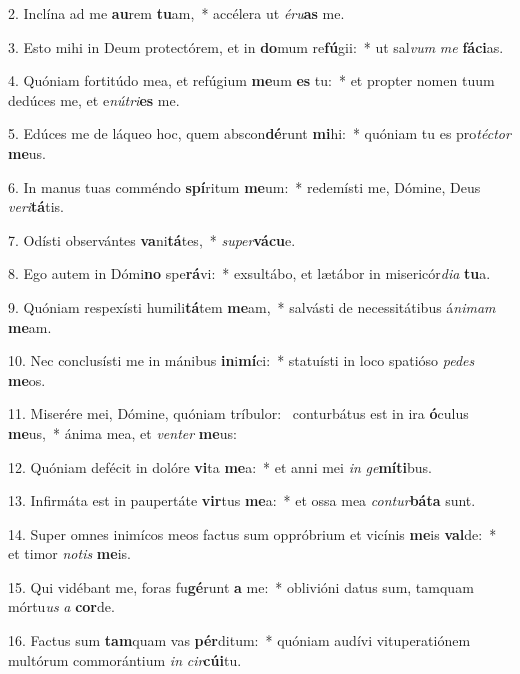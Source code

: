 2. Inclína ad me \textbf{au}rem \textbf{tu}am,~*  accélera ut \textit{é}\textit{ru}\textbf{as} me.\

3. Esto mihi in Deum protectórem, et in \textbf{do}mum re\textbf{fú}gii:~*  ut sal\textit{vum} \textit{me} \textbf{fá}\textbf{ci}as.\

4. Quóniam fortitúdo mea, et refúgium \textbf{me}um \textbf{es} tu:~*  et propter nomen tuum dedúces me, et e\textit{nú}\textit{tri}\textbf{es} me.\

5. Edúces me de láqueo hoc, quem abscon\textbf{dé}runt \textbf{mi}hi:~*  quóniam tu es pro\textit{téc}\textit{tor} \textbf{me}us.\

6. In manus tuas comméndo \textbf{spí}ritum \textbf{me}um:~*  redemísti me, Dómine, Deus \textit{ve}\textit{ri}\textbf{tá}tis.\

7. Odísti observántes \textbf{va}ni\textbf{tá}tes,~*  \textit{su}\textit{per}\textbf{vá}\textbf{cu}e.\

8. Ego autem in Dómi\textbf{no} spe\textbf{rá}vi:~*  exsultábo, et lætábor in misericór\textit{di}\textit{a} \textbf{tu}a.\

9. Quóniam respexísti humili\textbf{tá}tem \textbf{me}am,~*  salvásti de necessitátibus á\textit{ni}\textit{mam} \textbf{me}am.\

10. Nec conclusísti me in mánibus \textbf{in}i\textbf{mí}ci:~*  statuísti in loco spatióso \textit{pe}\textit{des} \textbf{me}os.\

11. Miserére mei, Dómine, quóniam tríbulor: \dag\  conturbátus est in ira \textbf{ó}culus \textbf{me}us,~*  ánima mea, et \textit{ven}\textit{ter} \textbf{me}us:\

12. Quóniam defécit in dolóre \textbf{vi}ta \textbf{me}a:~*  et anni mei \textit{in} \textit{ge}\textbf{mí}\textbf{ti}bus.\

13. Infirmáta est in paupertáte \textbf{vir}tus \textbf{me}a:~*  et ossa mea \textit{con}\textit{tur}\textbf{bá}\textbf{ta} sunt.\

14. Super omnes inimícos meos factus sum oppróbrium et vicínis \textbf{me}is \textbf{val}de:~*  et timor \textit{no}\textit{tis} \textbf{me}is.\

15. Qui vidébant me, foras fu\textbf{gé}runt \textbf{a} me:~*  oblivióni datus sum, tamquam mórtu\textit{us} \textit{a} \textbf{cor}de.\

16. Factus sum \textbf{tam}quam vas \textbf{pér}ditum:~*  quóniam audívi vituperatiónem multórum commorántium \textit{in} \textit{cir}\textbf{cú}\textbf{i}tu.\

